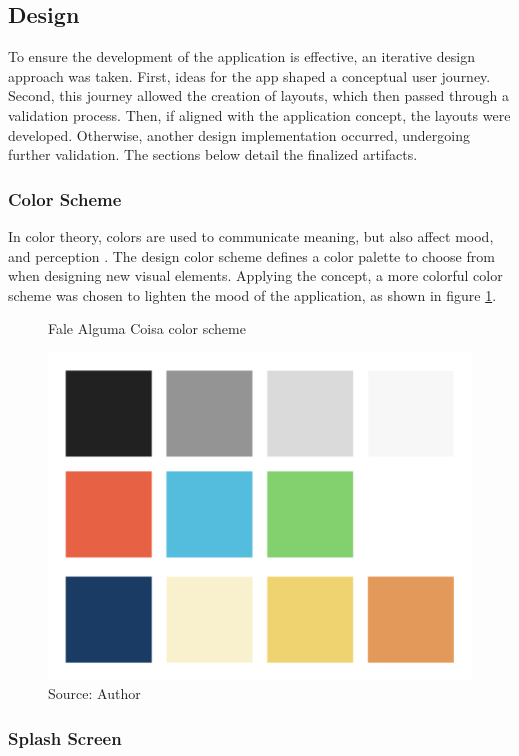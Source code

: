 \clearpage
\subsection{Design}
\label{sec:app-design}

To ensure the development of the application is effective, an iterative design approach was taken. First, ideas for the app shaped a conceptual user journey. Second, this journey allowed the creation of layouts, which then passed through a validation process. Then, if aligned with the application concept, the layouts were developed. Otherwise, another design implementation occurred, undergoing further validation. The sections below detail the finalized artifacts.

\subsubsection{Color Scheme}

In color theory, colors are used to communicate meaning, but also affect mood, and perception \cite{agoston2013color}. The design color scheme defines a color palette to choose from when designing new visual elements. Applying the concept, a more colorful color scheme was chosen to lighten the mood of the application, as shown in figure \ref{fig:falealgumacoisa-color-scheme}.

\begin{figure}[ht]
    \centering
    \caption{Fale Alguma Coisa color scheme}
     \includegraphics[width=.8\linewidth]{images/app/colors.png}
    \caption*{Source: Author}
    \label{fig:falealgumacoisa-color-scheme}
\end{figure}

\clearpage
\subsubsection{Splash Screen}

